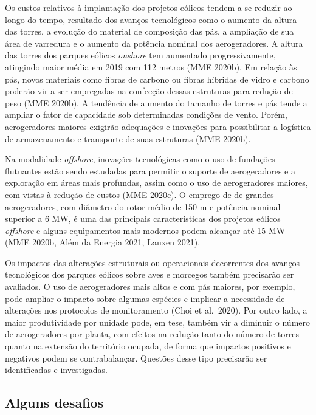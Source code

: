 \documentclass[
  oneside]{scrbook}
\begin{document}
Os custos relativos à implantação dos projetos eólicos tendem a se reduzir ao longo do tempo, resultado dos avanços tecnológicos como o aumento da altura das torres, a evolução do material de composição das pás, a ampliação de sua área de varredura e o aumento da potência nominal dos aerogeradores. A altura das torres dos parques eólicos \emph{onshore} tem aumentado progressivamente, atingindo maior média em 2019 com 112 metros (MME 2020b). Em relação às pás, novos materiais como fibras de carbono ou fibras híbridas de vidro e carbono poderão vir a ser empregadas na confecção dessas estruturas para redução de peso (MME 2020b). A tendência de aumento do tamanho de torres e pás tende a ampliar o fator de capacidade sob determinadas condições de vento. Porém, aerogeradores maiores exigirão adequações e inovações para possibilitar a logística de armazenamento e transporte de suas estruturas (MME 2020b).

Na modalidade \emph{offshore}, inovações tecnológicas como o uso de fundações flutuantes estão sendo estudadas para permitir o suporte de aerogeradores e a exploração em áreas mais profundas, assim como o uso de aerogeradores maiores, com vistas à redução de custos (MME 2020c). O emprego de de grandes aerogeradores, com diâmetro do rotor médio de 150 m e potência nominal superior a 6 MW, é uma das principais características dos projetos eólicos \emph{offshore} e alguns equipamentos mais modernos podem alcançar até 15 MW (MME 2020b, Além da Energia 2021, Lauxen 2021).

Os impactos das alterações estruturais ou operacionais decorrentes dos avanços tecnológicos dos parques eólicos sobre aves e morcegos também precisarão ser avaliados. O uso de aerogeradores mais altos e com pás maiores, por exemplo, pode ampliar o impacto sobre algumas espécies e implicar a necessidade de alterações nos protocolos de monitoramento (Choi et al.~2020). Por outro lado, a maior produtividade por unidade pode, em tese, também vir a diminuir o número de aerogeradores por planta, com efeitos na redução tanto do número de torres quanto na extensão do território ocupada, de forma que impactos positivos e negativos podem se contrabalançar. Questões desse tipo precisarão ser identificadas e investigadas.

\hypertarget{alguns-desafios}{%
\subsection{Alguns desafios}\label{alguns-desafios}}
\end{document}
